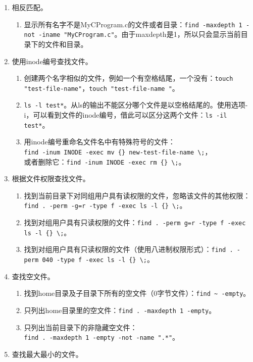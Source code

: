 \begin{enumerate}
  \item 相反匹配。
    \begin{enumerate}
      \item 显示所有名字不是MyCProgram.c的文件或者目录：\verb|find -maxdepth 1 -not -iname "MyCProgram.c"|。由于maxdepth是1，所以只会显示当前目录下的文件和目录。
    \end{enumerate}
  \item 使用inode编号查找文件。
    \begin{enumerate}
      \item 创建两个名字相似的文件，例如一个有空格结尾，一个没有：\verb|touch "test-file-name"|，\verb|touch "test-file-name "|。
      \item \verb|ls -l test*|。从ls的输出不能区分哪个文件是以空格结尾的。使用选项-i，可以看到文件的inode编号，借此可以区分这两个文件：\verb|ls -il test*|。
      \item 用inode编号重命名文件名中有特殊符号的文件：\\ \verb|find -inum INODE -exec mv {} new-test-file-name \;|，\\ 或者删除它：\verb|find -inum INODE -exec rm {} \;|。
    \end{enumerate}
  \item 根据文件权限查找文件。
    \begin{enumerate}
      \item 找到当前目录下对同组用户具有读权限的文件，忽略该文件的其他权限：\verb|find . -perm -g=r -type f -exec ls -l {} \;|。
      \item 找到对组用户具有只读权限的文件：\verb|find . -perm g=r -type f -exec ls -l {} \;|。
      \item 找到对组用户具有只读权限的文件（使用八进制权限形式）：\verb|find . -perm 040 -type f -exec ls -l {} \;|。
    \end{enumerate}
  \item 查找空文件。
    \begin{enumerate}
      \item 找到home目录及子目录下所有的空文件（0字节文件）：\verb|find ~ -empty|。
      \item 只列出home目录里的空文件：\verb|find . -maxdepth 1 -empty|。
      \item 只列出当前目录下的非隐藏空文件：\\ \verb|find . -maxdepth 1 -empty -not -name ".*"|。
    \end{enumerate}
  \item 查找最大最小的文件。
    \begin{enumerate}

\end{enumerate}
\end{enumerate}

